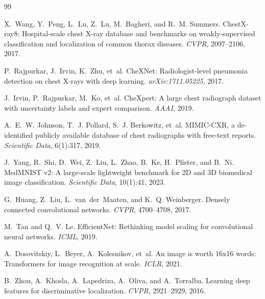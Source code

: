 \documentclass[10pt,twocolumn]{article}
\begin{document}
\balance
\begin{thebibliography}{99}
\scriptsize
\setlength{\itemsep}{0pt}
\setlength{\parsep}{0pt}

X.~Wang, Y.~Peng, L.~Lu, Z.~Lu, M.~Bagheri, and R.~M. Summers.
ChestX-ray8: Hospital-scale chest X-ray database and benchmarks on
weakly-supervised classification and localization of common thorax diseases.
\emph{CVPR}, 2097--2106, 2017.

P.~Rajpurkar, J.~Irvin, K.~Zhu, et~al.
CheXNet: Radiologist-level pneumonia detection on chest X-rays with deep learning.
\emph{arXiv:1711.05225}, 2017.

J.~Irvin, P.~Rajpurkar, M.~Ko, et~al.
CheXpert: A large chest radiograph dataset with uncertainty labels and expert
comparison. \emph{AAAI}, 2019.

A.~E.~W. Johnson, T.~J. Pollard, S.~J. Berkowitz, et~al.
MIMIC-CXR, a de-identified publicly available database of chest radiographs with
free-text reports. \emph{Scientific Data}, 6(1):317, 2019.

J.~Yang, R.~Shi, D.~Wei, Z.~Liu, L.~Zhao, B.~Ke, H.~Pfister, and B.~Ni.
MedMNIST v2: A large-scale lightweight benchmark for 2D and 3D biomedical image
classification. \emph{Scientific Data}, 10(1):41, 2023.

G.~Huang, Z.~Liu, L.~van~der~Maaten, and K.~Q. Weinberger.
Densely connected convolutional networks. \emph{CVPR}, 4700--4708, 2017.

M.~Tan and Q.~V. Le.
EfficientNet: Rethinking model scaling for convolutional neural networks.
\emph{ICML}, 2019.

A.~Dosovitskiy, L.~Beyer, A.~Kolesnikov, et~al.
An image is worth 16x16 words: Transformers for image recognition at scale.
\emph{ICLR}, 2021.

B.~Zhou, A.~Khosla, A.~Lapedriza, A.~Oliva, and A.~Torralba.
Learning deep features for discriminative localization. \emph{CVPR},
2921--2929, 2016.


\end{thebibliography}
\end{document}

